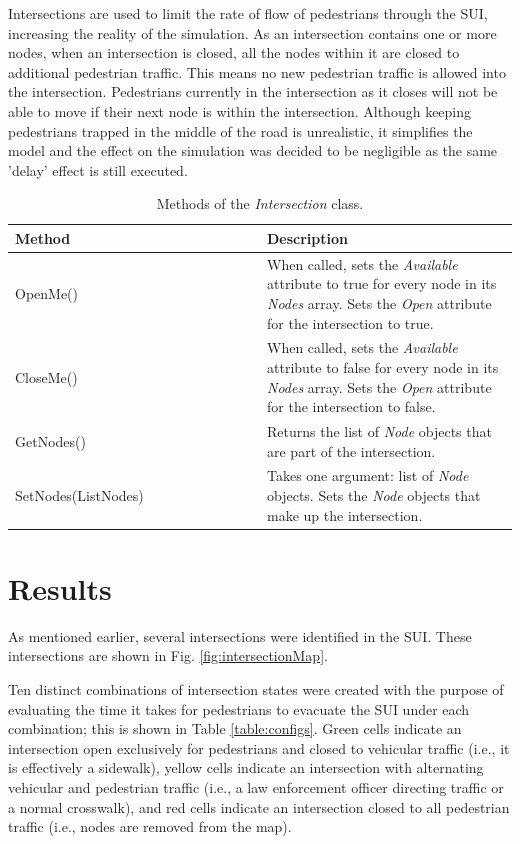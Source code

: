 \documentclass[12pt]{article}
\begin{document}
Intersections are used to limit the rate of flow of pedestrians through the SUI,
increasing the reality of the simulation. As an intersection contains one or
more nodes, when an intersection is closed, all the nodes within it are
closed to additional pedestrian traffic. This means no new pedestrian traffic is allowed into the intersection.  Pedestrians currently in the
intersection as it closes will not be able to move if their next node is within the intersection.  Although keeping pedestrians trapped in the middle of the road is unrealistic, it simplifies the model and the effect on the simulation was decided to be negligible as the same 'delay' effect is still executed.

\def\arraystretch{1.5}
\begin{table}
  \centering
    \begin{tabular}{p{0.5\linewidth}p{0.5\linewidth}}
     \hline
     Method & Description \\
     \hline
     OpenMe()  & When called, sets the \textit{Available} attribute to
                 true for every node in its \textit{Nodes} array. Sets the
                 \textit{Open} attribute for the intersection to true. \\
     CloseMe() & When called, sets the \textit{Available} attribute to
                 false for every node in its \textit{Nodes} array. Sets the
                 \textit{Open} attribute for the intersection to false. \\
     GetNodes() & Returns the list of \textit{Node} objects that are part of the
                  intersection. \\
     SetNodes(ListNodes) & Takes one argument: list of \textit{Node} objects.
                           Sets the \textit{Node} objects that make up the
                           intersection. \\
     \hline
    \end{tabular}
    \caption{Methods of the \textit{Intersection} class.}
    \label{table:intersection_methods}
\end{table}

\section{Results}
As mentioned earlier, several intersections were identified in the SUI.  These
intersections are shown in Fig. \ref{fig:intersectionMap}.

Ten distinct combinations of intersection states were created with the purpose
of evaluating the time it takes for pedestrians to evacuate the SUI under each
combination; this is shown in Table \ref{table:configs}.  Green cells indicate
an intersection open exclusively for pedestrians and closed to vehicular traffic (i.e., it is effectively a sidewalk),
yellow cells indicate an intersection with alternating vehicular and pedestrian
traffic (i.e., a law enforcement officer directing traffic or a normal crosswalk), and red cells indicate
an intersection closed to all pedestrian traffic (i.e., nodes are removed from
the map).
\end{document}
